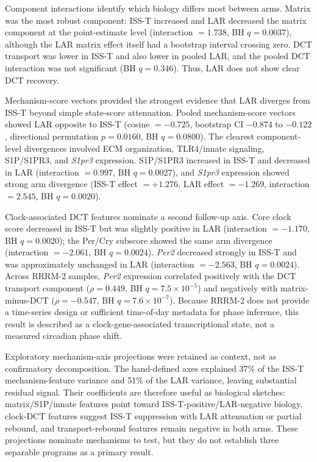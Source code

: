 \documentclass[11pt]{article}
\newcommand{\gene}[1]{\textit{#1}}
\begin{document}
Component interactions identify which biology differs most between arms. Matrix was the most robust component: ISS-T increased and LAR decreased the matrix component at the point-estimate level (interaction $=1.738$, BH $q=0.0037$), although the LAR matrix effect itself had a bootstrap interval crossing zero. DCT transport was lower in ISS-T and also lower in pooled LAR, and the pooled DCT interaction was not significant (BH $q=0.346$). Thus, LAR does not show clear DCT recovery.

Mechanism-score vectors provided the strongest evidence that LAR diverges from ISS-T beyond simple state-score attenuation. Pooled mechanism-score vectors showed LAR opposite to ISS-T (cosine $=-0.725$, bootstrap CI $-0.874$ to $-0.122$, directional permutation $p=0.0160$, BH $q=0.0800$). The clearest component-level divergences involved ECM organization, TLR4/innate signaling, S1P/S1PR3, and \gene{S1pr3} expression. S1P/S1PR3 increased in ISS-T and decreased in LAR (interaction $=0.997$, BH $q=0.0027$), and \gene{S1pr3} expression showed strong arm divergence (ISS-T effect $=+1.276$, LAR effect $=-1.269$, interaction $=2.545$, BH $q=0.0020$).

Clock-associated DCT features nominate a second follow-up axis. Core clock score decreased in ISS-T but was slightly positive in LAR (interaction $=-1.170$, BH $q=0.0020$); the Per/Cry subscore showed the same arm divergence (interaction $=-2.061$, BH $q=0.0024$). \gene{Per2} decreased strongly in ISS-T and was approximately unchanged in LAR (interaction $=-2.563$, BH $q=0.0024$). Across RRRM-2 samples, \gene{Per2} expression correlated positively with the DCT transport component ($\rho=0.449$, BH $q=7.5\times10^{-5}$) and negatively with matrix-minus-DCT ($\rho=-0.547$, BH $q=7.6\times10^{-7}$). Because RRRM-2 does not provide a time-series design or sufficient time-of-day metadata for phase inference, this result is described as a clock-gene-associated transcriptional state, not a measured circadian phase shift.

Exploratory mechanism-axis projections were retained as context, not as confirmatory decomposition. The hand-defined axes explained 37\% of the ISS-T mechanism-feature variance and 51\% of the LAR variance, leaving substantial residual signal. Their coefficients are therefore useful as biological sketches: matrix/S1P/innate features point toward ISS-T-positive/LAR-negative biology, clock-DCT features suggest ISS-T suppression with LAR attenuation or partial rebound, and transport-rebound features remain negative in both arms. These projections nominate mechanisms to test, but they do not establish three separable programs as a primary result.
\end{document}
